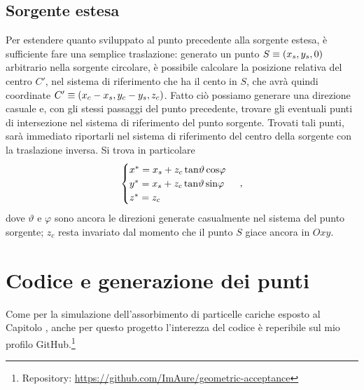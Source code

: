         \subsection{Sorgente estesa}
            Per estendere quanto sviluppato al punto precedente alla sorgente estesa, è sufficiente fare una semplice traslazione: generato un punto $S\equiv\pqty{x_s, y_s, 0}$ arbitrario nella sorgente circolare, è possibile calcolare la posizione relativa del centro $C'$, nel sistema di riferimento che ha il cento in $S$, che avrà quindi coordinate $C'\equiv\pqty{x_c - x_s, y_c - y_s, z_c}$. Fatto ciò possiamo generare una direzione casuale e, con gli stessi passaggi del punto precedente, trovare gli eventuali punti di intersezione nel sistema di riferimento del punto sorgente. Trovati tali punti, sarà immediato riportarli nel sistema di riferimento del centro della sorgente con la traslazione inversa. Si trova in particolare
            \begin{equation*}
                \begin{cases}
                    x^* = x_s + z_c\tan\!\vartheta\cos\!\varphi \\
                    y^* = x_s + z_c\tan\!\vartheta\sin\!\varphi \\
                    z^* = z_c
                \end{cases}
                \,,
            \end{equation*}
            dove $\vartheta$ e $\varphi$ sono ancora le direzioni generate casualmente nel sistema del punto sorgente; $z_c$ resta invariato dal momento che il punto $S$ giace ancora in $Oxy$.
    
    \section{Codice e generazione dei punti}
        Come per la simulazione dell'assorbimento di particelle cariche esposto al Capitolo , anche per questo progetto l'interezza del codice è reperibile sul mio profilo GitHub.\footnote{Repository: \url{https://github.com/ImAure/geometric-acceptance}}


